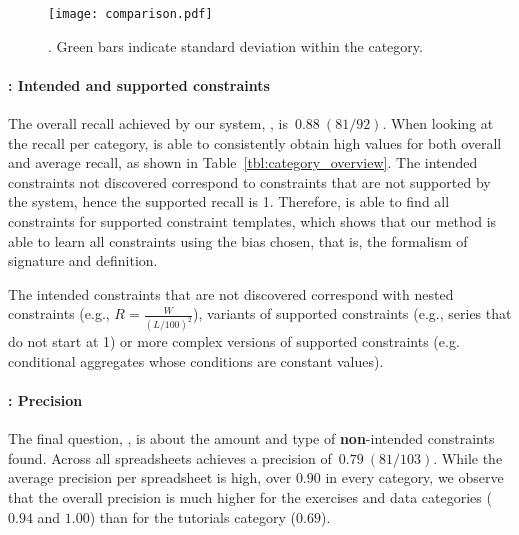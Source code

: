 \begin{figure}[t]
  \centering
  \texttt{[image: comparison.pdf]}
  \caption{.
  Green bars indicate standard deviation within the category.}
  \label{fig:comparison}
\end{figure}


\paragraph{\qtwo: Intended and supported constraints}
The overall recall achieved by our system, \sname, is~$0.88~(81/92)$.
When looking at the recall per category, \sname is able to consistently obtain high values for both overall and average recall, as shown in Table~\ref{tbl:category_overview}.
The intended constraints not discovered correspond to constraints that are not supported by the system, hence the supported recall is 1.
Therefore, \sname is able to find all constraints for supported constraint templates, which shows that our method is able to learn all constraints using the bias chosen, that is, the formalism of signature and definition. 


The intended constraints that are not discovered correspond with nested constraints (e.g., $R = \frac{W}{(L/100)^2}$), variants of supported constraints (e.g., series that do not start at 1) or more complex versions of supported constraints (e.g. conditional aggregates whose conditions are constant values). 

\paragraph{\qthree: Precision}
The final question, \qthree, is about the amount and type of \textbf{non}-intended constraints found.
Across all spreadsheets \sname achieves a precision of~$0.79~(81/103)$.
While the average precision per spreadsheet is high, over $0.90$ in every category, we observe that the overall precision is much higher for the exercises and data categories ($0.94$ and $1.00$) than for the tutorials category ($0.69$).

